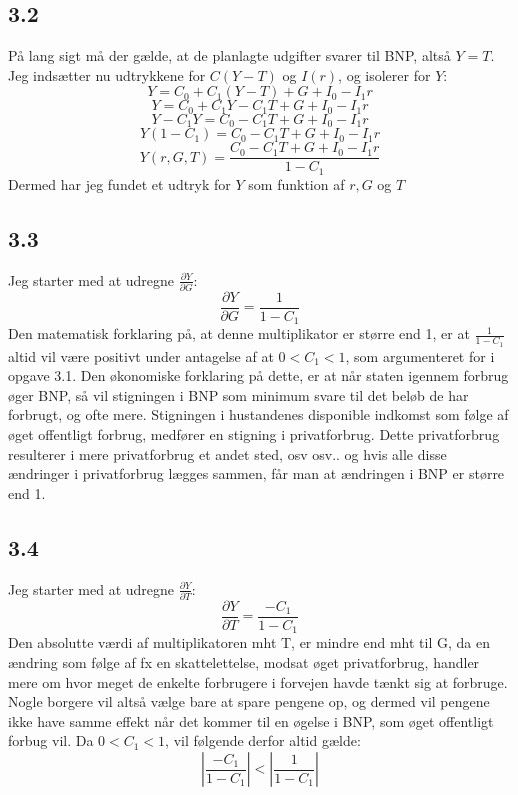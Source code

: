\documentclass{article}
\begin{document}
\subsection*{3.2}
På lang sigt må der gælde, at de planlagte udgifter svarer til BNP, altså $Y=T$. Jeg indsætter nu udtrykkene for $C(Y-T)$ og $I(r)$, og isolerer for $Y$:
\begin{equation}
    Y=C_0+C_1(Y-T)+G+I_0-I_1 r
\end{equation}
\begin{equation}
    Y=C_0+C_1 Y-C_1 T+G+I_0-I_1 r
\end{equation}
\begin{equation}
    Y-C_1 Y=C_0-C_1 T+G+I_0-I_1 r
\end{equation}
\begin{equation}
    Y\left(1-C_1\right)=C_0-C_1 T+G+I_0-I_1 r
\end{equation}
\begin{equation}
    Y(r, G, T)=\frac{C_0-C_1 T+G+I_0-I_1 r}{1-C_1}
\end{equation}
Dermed har jeg fundet et udtryk for $Y$ som funktion af $r, G$ og $T$

\subsection*{3.3}
Jeg starter med at udregne $\frac{\partial Y}{\partial G}$:
\begin{equation}
    \frac{\partial Y}{\partial G}=\frac{1}{1-C_1}
\end{equation}
Den matematisk forklaring på, at denne multiplikator er større end 1, er at $\frac{1}{1-C_1}$ altid vil være positivt under antagelse af at $0<C_1<1$, som argumenteret for i opgave 3.1. Den økonomiske forklaring på dette, er at når staten igennem forbrug øger BNP, så vil stigningen i BNP som minimum svare til det beløb de har forbrugt, og ofte mere. Stigningen i hustandenes disponible indkomst som følge af øget offentligt forbrug, medfører en stigning i privatforbrug. Dette privatforbrug resulterer i mere privatforbrug et andet sted, osv osv.. og hvis alle disse ændringer i privatforbrug lægges sammen, får man at ændringen i BNP er større end 1.

\subsection*{3.4}
Jeg starter med at udregne $\frac{\partial Y}{\partial T}$:
\begin{equation}
    \frac{\partial Y}{\partial T}=\frac{-C_1}{1-C_1}
\end{equation}
Den absolutte værdi af multiplikatoren mht T, er mindre end mht til G, da en ændring som følge af fx en skattelettelse, modsat øget privatforbrug, handler mere om hvor meget de enkelte forbrugere i forvejen havde tænkt sig at forbruge. Nogle borgere vil altså vælge bare at spare pengene op, og dermed vil pengene ikke have samme effekt når det kommer til en øgelse i BNP, som øget offentligt forbug vil. Da $0<C_1<1$, vil følgende derfor altid gælde:
\begin{equation}
    \left|\frac{-C_1}{1-C_1}\right|<\left|\frac{1}{1-C_1}\right|
\end{equation}
\end{document}
